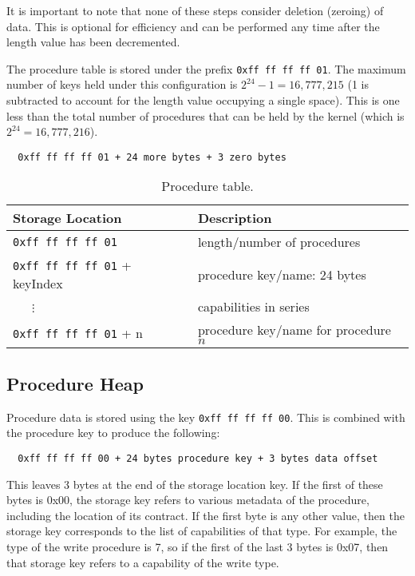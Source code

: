 \documentclass[english,a4paper]{article}
\begin{document}
It is important to note that none of these steps consider deletion (zeroing) of
data. This is optional for efficiency and can be performed any time after the
length value has been decremented.

The procedure table is stored under the prefix \texttt{0xff ff ff ff 01}. The
maximum number of keys held under this configuration is $2^{24} - 1 =
16,777,215$ (1 is subtracted to account for the length value occupying a single
space). This is one less than the total number of procedures that can be held by
the kernel (which is $2^{24} = 16,777,216$).

\begin{verbatim}
  0xff ff ff ff 01 + 24 more bytes + 3 zero bytes
\end{verbatim}

\begin{table}[H]
  \caption{Procedure table.}
  \centering{}%
  \begin{tabular}{l|p{}}
    \hline
    Storage Location & Description\tabularnewline
    \hline
    \hline
    \texttt{0xff ff ff ff 01}     & length/number of procedures
      \tabularnewline
    \texttt{0xff ff ff ff 01} + keyIndex & procedure key/name: 24 bytes
      \tabularnewline
    ~~~$\vdots$ & capabilities in series \tabularnewline
    \texttt{0xff ff ff ff 01} + n & procedure key/name for procedure $n$
      \tabularnewline
    \hline
  \end{tabular}
\end{table}

\subsection{Procedure Heap}\label{procedure-heap}

Procedure data is stored using the key \texttt{0xff ff ff ff 00}. This is
combined with the procedure key to produce the following:

\begin{verbatim}
  0xff ff ff ff 00 + 24 bytes procedure key + 3 bytes data offset
\end{verbatim}

This leaves 3 bytes at the end of the storage location key. If the first of
these bytes is 0x00, the storage key refers to various metadata of the
procedure, including the location of its contract. If the first byte is any
other value, then the storage key corresponds to the list of capabilities of
that type. For example, the type of the write procedure is 7, so if the first of
the last 3 bytes is 0x07, then that storage key refers to a capability of the
write type.
\end{document}
